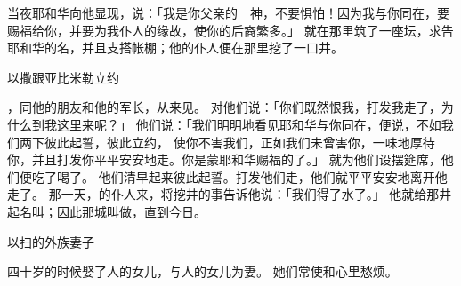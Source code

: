 {当夜耶和华向他显现，说：「我是你父亲{}的　神，不要惧怕！因为我与你同在，要赐福给你，并要为我仆人{}的缘故，使你的后裔繁多。」
就在那里筑了一座坛，求告耶和华的名，并且支搭帐棚；他的仆人便在那里挖了一口井。
\par }{\SH 以撒跟亚比米勒立约
\par }{\PP {}，同他的朋友{}和他的军长{}，从{}来见{}。
对他们说：「你们既然恨我，打发我走了，为什么到我这里来呢？」
他们说：「我们明明地看见耶和华与你同在，便说，不如我们两下彼此起誓，彼此立约，
使你不害我们，正如我们未曾害你，一味地厚待你，并且打发你平平安安地走。你是蒙耶和华赐福的了。」
就为他们设摆筵席，他们便吃了喝了。
他们清早起来彼此起誓。{}打发他们走，他们就平平安安地离开他走了。
那一天，{}的仆人来，将挖井的事告诉他说：「我们得了水了。」
他就给那井起名叫{}；因此那城叫做{}，直到今日。
\par }{\SH 以扫的外族妻子
\par }{\PP {}四十岁的时候娶了{}人{}的女儿{}，与{}人{}的女儿{}为妻。
她们常使{}和{}心里愁烦。

}
